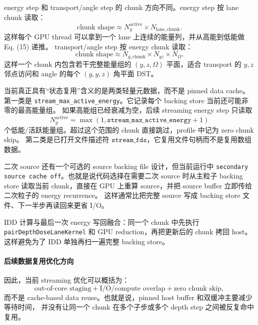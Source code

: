 \documentclass[11pt,a4paper]{ctexart}
\begin{document}
energy step 和 transport/angle step 的 chunk 方向不同。energy step 按 lane chunk 读取：
\begin{equation}
  \text{chunk shape}\approx N_g^{\mathrm{active}}\times N_{\mathrm{lane,chunk}}.
\end{equation}
这样每个 GPU thread 可以拿到一个 lane 上连续的能量列，并从高能到低能做 Eq. (15) 递推。
transport/angle step 按 energy chunk 读取：
\begin{equation}
  \text{chunk shape}\approx N_{g,\mathrm{chunk}}\times N_{yz}\times N_\Omega.
\end{equation}
这样一个 chunk 内包含若干完整能量组的 \((y,z,\Omega)\) 平面，适合 transport 的 \(y,z\)
邻点访问和 angle 的每个 \((g,y,z)\) 角平面 DST。

当前真正具有“状态复用”含义的是两类轻量元数据，而不是 pinned data cache。第一类是
\texttt{stream\_max\_active\_energy}。它记录每个 backing store 当前还可能非零的最高能量组。
如果高能组已经衰减为空，后续 streaming energy step 只读取
\begin{equation}
  N_g^{\mathrm{active}}
  =
  \max(1,\texttt{stream\_max\_active\_energy}+1)
\end{equation}
个低能/活跃能量组。超过这个范围的 chunk 直接跳过，profile 中记为 zero chunk skip。
第二类是已打开文件描述符 \(\texttt{stream\_fds}\)，它复用文件句柄而不是复用数组数据。

二次 source 还有一个可选的 source backing file 设计，但当前运行中
\texttt{secondary source cache off}。也就是说代码选择在需要二次 source 时从主粒子 backing store
读取当前 chunk，直接在 GPU 上重算 source，并把 source buffer 立即传给二次粒子的 energy recurrence。
这样通常比把完整 source 写成 backing store 文件、下一半步再读回来更省 I/O。

IDD 计算与最后一次 energy 写回融合：同一个 chunk 中先执行
\texttt{pairDepthDoseLaneKernel} 和 GPU reduction，再把更新后的 chunk 拷回 host。
这样避免为了 IDD 单独再扫一遍完整 backing store。

\paragraph{后续数据复用优化方向}
因此，当前 streaming 优化可以概括为：
\begin{equation}
  \text{out-of-core staging}
  +
  \text{I/O/compute overlap}
  +
  \text{zero chunk skip},
\end{equation}
而不是 cache-based data reuse。也就是说，pinned host buffer 和双缓冲主要减少等待时间，
并没有让同一个 chunk 在多个子步或多个 depth step 之间被反复命中复用。
\end{document}
